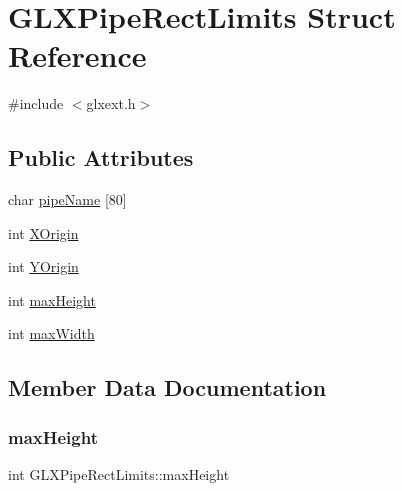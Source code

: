 \hypertarget{struct_g_l_x_pipe_rect_limits}{}\section{G\+L\+X\+Pipe\+Rect\+Limits Struct Reference}
\label{struct_g_l_x_pipe_rect_limits}


{\ttfamily \#include $<$glxext.\+h$>$}

\subsection*{Public Attributes}
\begin{DoxyCompactItemize}
\item 
char \hyperlink{struct_g_l_x_pipe_rect_limits_a8185d6cb288eef8cbacb9eb9f3c50d79}{pipe\+Name} \mbox{[}80\mbox{]}
\item 
int \hyperlink{struct_g_l_x_pipe_rect_limits_a3e5a965059d9f5d2ca42acd35af5bb9b}{X\+Origin}
\item 
int \hyperlink{struct_g_l_x_pipe_rect_limits_a50e06bcf0dae95854be7d93a515199e9}{Y\+Origin}
\item 
int \hyperlink{struct_g_l_x_pipe_rect_limits_a27572e499c0d3280031c2ad8e387c0c1}{max\+Height}
\item 
int \hyperlink{struct_g_l_x_pipe_rect_limits_a8662c7a712b30620e25fc994adf337a1}{max\+Width}
\end{DoxyCompactItemize}


\subsection{Member Data Documentation}
\mbox{\label{struct_g_l_x_pipe_rect_limits_a27572e499c0d3280031c2ad8e387c0c1}} 
\subsubsection{\texorpdfstring{max\+Height}{maxHeight}}
{\footnotesize\ttfamily int G\+L\+X\+Pipe\+Rect\+Limits\+::max\+Height}

\mbox{\label{struct_g_l_x_pipe_rect_limits_a8662c7a712b30620e25fc994adf337a1}} 
